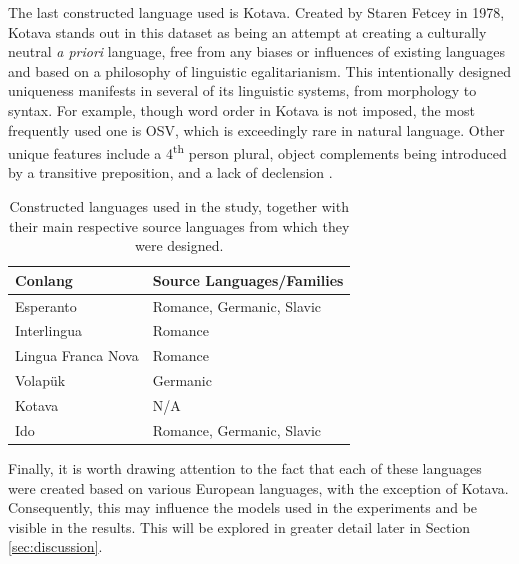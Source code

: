 \documentclass[12pt,a4paper]{article}
\numberwithin{figure}{section}
\numberwithin{table}{section}
\numberwithin{definition}{section}
\begin{document}

The last constructed language used is Kotava. Created by Staren Fetcey in 1978, Kotava stands out in this dataset as being an attempt at creating a culturally neutral \textit{a priori} language, free from any biases or influences of existing languages and based on a philosophy of linguistic egalitarianism. This intentionally designed uniqueness manifests in several of its linguistic systems, from morphology to syntax. For example, though word order in Kotava is not imposed, the most frequently used one is OSV, which is exceedingly rare in natural language. Other unique features include a 4\textsuperscript{th} person plural, object complements being introduced by a transitive preposition, and a lack of declension \parencite{Fetcey2013book}. 


\begin{table}[h!]
  \centering
  \renewcommand{\arraystretch}{1.5}
  \begin{tabular} {|p{5cm}|p{5cm}|}
  \hline
  \textbf{Conlang} & \textbf{Source Languages/Families} \\
  \hline
  Esperanto & Romance, Germanic, Slavic \\
  \hline
  Interlingua & Romance \\
  \hline
  Lingua Franca Nova & Romance \\
  \hline
  Volapük & Germanic \\
  \hline
  Kotava & N/A \\
  \hline
  Ido & Romance, Germanic, Slavic \\
  \hline
  \end{tabular}
  \caption{Constructed languages used in the study, together with their main respective source languages from which they were designed.}
  \label{tbl:conlangs}
\end{table}

Finally, it is worth drawing attention to the fact that each of these languages were created based on various European languages, with the exception of Kotava. Consequently, this may influence the models used in the experiments and be visible in the results. This will be explored in greater detail later in Section \ref{sec:discussion}.
\end{document}
